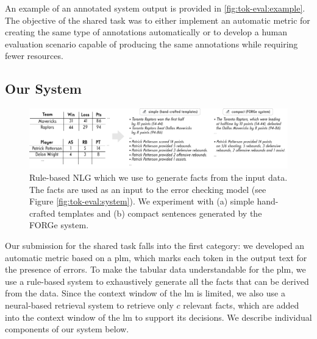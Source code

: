An example of an annotated system output is provided in \autoref{fig:tok-eval:example}. The objective of the shared task was to either implement an automatic metric for creating the same type of annotations automatically or to develop a human evaluation scenario capable of producing the same annotations while requiring fewer resources.





\subsection{Our System}
\label{sec:tok-eval:system}

\begin{figure}[ht]
    \centering
    \includegraphics[width=\textwidth]{img/tok-eval_generator.pdf}
    \caption[Our rule-based systems for generating facts from the input data.]{Rule-based NLG which we use to generate facts from the input data. The facts are used as an input to the error checking model (see Figure \ref{fig:tok-eval:system}). We experiment with (a) simple hand-crafted templates and (b) compact sentences generated by the FORGe system.}
    \label{fig:tok-eval:gen}
\end{figure}





Our submission for the shared task falls into the first category: we developed an automatic metric based on a \ac{plm}, which marks each token in the output text for the presence of errors. To make the tabular data understandable for the \ac{plm}, we use a rule-based system to exhaustively generate all the facts that can be derived from the data. Since the context window of the \ac{lm} is limited, we also use a neural-based retrieval system to retrieve only $c$ relevant facts, which are added into the context window of the \ac{lm} to support its decisions. We describe individual components of our system below.

